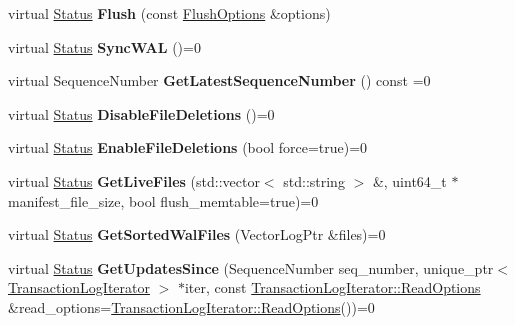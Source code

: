 \begin{DoxyCompactItemize}
\item 
virtual \hyperlink{classrocksdb_1_1Status}{Status} {\bfseries Flush} (const \hyperlink{structrocksdb_1_1FlushOptions}{Flush\+Options} \&options)\hypertarget{classrocksdb_1_1DB_ae50d0a8ea55b682b6f4fe1e696f388ba}{}\label{classrocksdb_1_1DB_ae50d0a8ea55b682b6f4fe1e696f388ba}

\item 
virtual \hyperlink{classrocksdb_1_1Status}{Status} {\bfseries Sync\+W\+AL} ()=0\hypertarget{classrocksdb_1_1DB_afd06e3e012663cb19640a82b741b6884}{}\label{classrocksdb_1_1DB_afd06e3e012663cb19640a82b741b6884}

\item 
virtual Sequence\+Number {\bfseries Get\+Latest\+Sequence\+Number} () const =0\hypertarget{classrocksdb_1_1DB_a71590d8fbc17ba01c39d2067cd26a084}{}\label{classrocksdb_1_1DB_a71590d8fbc17ba01c39d2067cd26a084}

\item 
virtual \hyperlink{classrocksdb_1_1Status}{Status} {\bfseries Disable\+File\+Deletions} ()=0\hypertarget{classrocksdb_1_1DB_a03dd54471b0ab3aadbd88200b305d9a9}{}\label{classrocksdb_1_1DB_a03dd54471b0ab3aadbd88200b305d9a9}

\item 
virtual \hyperlink{classrocksdb_1_1Status}{Status} {\bfseries Enable\+File\+Deletions} (bool force=true)=0\hypertarget{classrocksdb_1_1DB_a8972bd881003084cfd646487fbe0ee0a}{}\label{classrocksdb_1_1DB_a8972bd881003084cfd646487fbe0ee0a}

\item 
virtual \hyperlink{classrocksdb_1_1Status}{Status} {\bfseries Get\+Live\+Files} (std\+::vector$<$ std\+::string $>$ \&, uint64\+\_\+t $\ast$manifest\+\_\+file\+\_\+size, bool flush\+\_\+memtable=true)=0\hypertarget{classrocksdb_1_1DB_a1c645c8ae376c0acd11a3271ec3a59ad}{}\label{classrocksdb_1_1DB_a1c645c8ae376c0acd11a3271ec3a59ad}

\item 
virtual \hyperlink{classrocksdb_1_1Status}{Status} {\bfseries Get\+Sorted\+Wal\+Files} (Vector\+Log\+Ptr \&files)=0\hypertarget{classrocksdb_1_1DB_a4cbc3ccd04ec78d0268b38397c2af029}{}\label{classrocksdb_1_1DB_a4cbc3ccd04ec78d0268b38397c2af029}

\item 
virtual \hyperlink{classrocksdb_1_1Status}{Status} {\bfseries Get\+Updates\+Since} (Sequence\+Number seq\+\_\+number, unique\+\_\+ptr$<$ \hyperlink{classrocksdb_1_1TransactionLogIterator}{Transaction\+Log\+Iterator} $>$ $\ast$iter, const \hyperlink{structrocksdb_1_1TransactionLogIterator_1_1ReadOptions}{Transaction\+Log\+Iterator\+::\+Read\+Options} \&read\+\_\+options=\hyperlink{structrocksdb_1_1TransactionLogIterator_1_1ReadOptions}{Transaction\+Log\+Iterator\+::\+Read\+Options}())=0\hypertarget{classrocksdb_1_1DB_aa604af3c08d15340565f4552acfde5cc}{}\label{classrocksdb_1_1DB_aa604af3c08d15340565f4552acfde5cc}


\end{DoxyCompactItemize}
